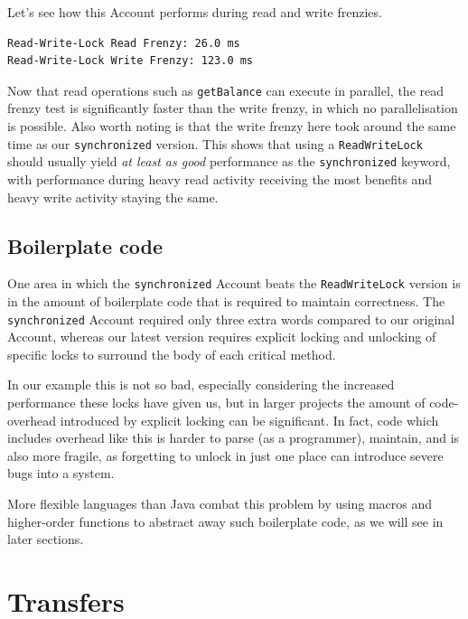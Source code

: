 \documentclass[a4paper,12pt]{kth-mag}
\begin{document}
Let's see how this Account performs during read and write frenzies.

\begin{listing}[H]
	\begin{verbatim}
Read-Write-Lock Read Frenzy: 26.0 ms
Read-Write-Lock Write Frenzy: 123.0 ms
	\end{verbatim}
\end{listing}

Now that read operations such as \texttt{getBalance} can execute in parallel, the read frenzy test is significantly faster than the write frenzy, in which no parallelisation is possible. Also worth noting is that the write frenzy here took around the same time as our \texttt{synchronized} version. This shows that using a \texttt{ReadWriteLock} should usually yield \textit{at least as good} performance as the \texttt{synchronized} keyword, with performance during heavy read activity receiving the most benefits and heavy write activity staying the same.

\subsection{Boilerplate code}

One area in which the \texttt{synchronized} Account beats the \texttt{ReadWriteLock} version is in the amount of boilerplate code that is required to maintain correctness. The \texttt{synchronized} Account required only three extra words compared to our original Account, whereas our latest version requires explicit locking and unlocking of specific locks to surround the body of each critical method. 

In our example this is not so bad, especially considering the increased performance these locks have given us, but in larger projects the amount of code-overhead introduced by explicit locking can be significant. In fact, code which includes overhead like this is harder to parse (as a programmer), maintain, and is also more fragile, as forgetting to unlock in just one place can introduce severe bugs into a system.

More flexible languages than Java combat this problem by using macros and higher-order functions to abstract away such boilerplate code, as we will see in later sections.

\section{Transfers}
\end{document}
